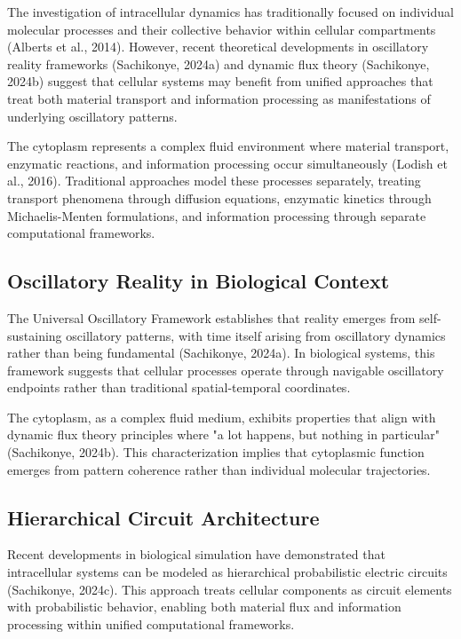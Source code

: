 \documentclass[12pt,a4paper]{article}
\begin{document}
The investigation of intracellular dynamics has traditionally focused on individual molecular processes and their collective behavior within cellular compartments (Alberts et al., 2014). However, recent theoretical developments in oscillatory reality frameworks (Sachikonye, 2024a) and dynamic flux theory (Sachikonye, 2024b) suggest that cellular systems may benefit from unified approaches that treat both material transport and information processing as manifestations of underlying oscillatory patterns.

The cytoplasm represents a complex fluid environment where material transport, enzymatic reactions, and information processing occur simultaneously (Lodish et al., 2016). Traditional approaches model these processes separately, treating transport phenomena through diffusion equations, enzymatic kinetics through Michaelis-Menten formulations, and information processing through separate computational frameworks.

\subsection{Oscillatory Reality in Biological Context}

The Universal Oscillatory Framework establishes that reality emerges from self-sustaining oscillatory patterns, with time itself arising from oscillatory dynamics rather than being fundamental (Sachikonye, 2024a). In biological systems, this framework suggests that cellular processes operate through navigable oscillatory endpoints rather than traditional spatial-temporal coordinates.

The cytoplasm, as a complex fluid medium, exhibits properties that align with dynamic flux theory principles where "a lot happens, but nothing in particular" (Sachikonye, 2024b). This characterization implies that cytoplasmic function emerges from pattern coherence rather than individual molecular trajectories.

\subsection{Hierarchical Circuit Architecture}

Recent developments in biological simulation have demonstrated that intracellular systems can be modeled as hierarchical probabilistic electric circuits (Sachikonye, 2024c). This approach treats cellular components as circuit elements with probabilistic behavior, enabling both material flux and information processing within unified computational frameworks.
\end{document}
